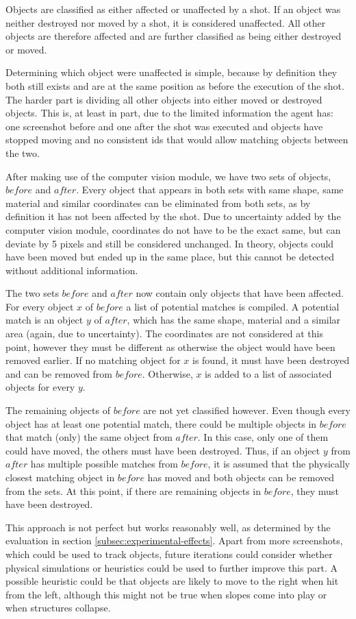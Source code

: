 Objects are classified as either affected or unaffected by a shot.
If an object was neither destroyed nor moved by a shot, it is considered unaffected.
All other objects are therefore affected and are further classified as being either destroyed or moved.

Determining which object were unaffected is simple, because by definition they both still exists and are at the same position as before the execution of the shot. The harder part is dividing all other objects into either moved or destroyed objects.
This is, at least in part, due to the limited information the agent has: one screenshot before and one after the shot was executed and objects have stopped moving and no consistent ids that would allow matching objects between the two.

After making use of the computer vision module, we have two sets of objects, $before$ and $after$. Every object that appears in both sets with same shape, same material and similar coordinates can be eliminated from both sets, as by definition it has not been affected by the shot.
Due to uncertainty added by the computer vision module, coordinates do not have to be the exact same, but can deviate by 5 pixels and still be considered unchanged. In theory, objects could have been moved but ended up in the same place, but this cannot be detected without additional information.

The two sets $before$ and $after$ now contain only objects that have been affected.
For every object $x$ of $before$ a list of potential matches is compiled. A potential match is an object $y$ of $after$, which has the same shape, material and a similar area (again, due to uncertainty). The coordinates are not considered at this point, however they must be different as otherwise the object would have been removed earlier.
If no matching object for $x$ is found, it must have been destroyed and can be removed from $before$. Otherwise, $x$ is added to a list of associated objects for every $y$.

The remaining objects of $before$ are not yet classified however. Even though every object has at least one potential match, there could be multiple objects in $before$ that match (only) the same object from $after$. In this case, only one of them could have moved, the others must have been destroyed. Thus, if an object $y$ from $after$ has multiple possible matches from $before$, it is assumed that the physically closest matching object in $before$ has moved and both objects can be removed from the sets. At this point, if there are remaining objects in $before$, they must have been destroyed.

This approach is not perfect but works reasonably well, as determined by the evaluation in section \ref{subsec:experimental-effects}. Apart from more screenshots, which could be used to track objects, future iterations could consider whether physical simulations or heuristics could be used to further improve this part.
A possible heuristic could be that objects are likely to move to the right when hit from the left, although this might not be true when slopes come into play or when structures collapse.
